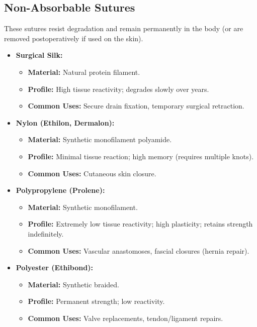 \subsection*{Non-Absorbable Sutures}
These sutures resist degradation and remain permanently in the body (or are removed postoperatively if used on the skin).
\begin{itemize}
  \item \textbf{Surgical Silk:}
  \begin{itemize}
    \item \textbf{Material:} Natural protein filament.
    \item \textbf{Profile:} High tissue reactivity; degrades slowly over years.
    \item \textbf{Common Uses:} Secure drain fixation, temporary surgical retraction.
  \end{itemize}
  \item \textbf{Nylon (Ethilon, Dermalon):}
  \begin{itemize}
    \item \textbf{Material:} Synthetic monofilament polyamide.
    \item \textbf{Profile:} Minimal tissue reaction; high memory (requires multiple knots).
    \item \textbf{Common Uses:} Cutaneous skin closure.
  \end{itemize}
  \item \textbf{Polypropylene (Prolene):}
  \begin{itemize}
    \item \textbf{Material:} Synthetic monofilament.
    \item \textbf{Profile:} Extremely low tissue reactivity; high plasticity; retains strength indefinitely.
    \item \textbf{Common Uses:} Vascular anastomoses, fascial closures (hernia repair).
  \end{itemize}
  \item \textbf{Polyester (Ethibond):}
  \begin{itemize}
    \item \textbf{Material:} Synthetic braided.
    \item \textbf{Profile:} Permanent strength; low reactivity.
    \item \textbf{Common Uses:} Valve replacements, tendon/ligament repairs.
  \end{itemize}
\end{itemize}


